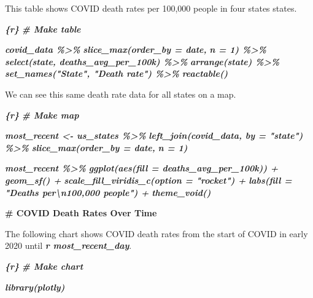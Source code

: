 \documentclass[
]{book}
\newenvironment{Shaded}{\begin{snugshade}}{\end{snugshade}}
\newcommand{\FunctionTok}[1]{\textcolor[rgb]{0.13,0.29,0.53}{\textbf{#1}}}
\newcommand{\InformationTok}[1]{\textcolor[rgb]{0.56,0.35,0.01}{\textbf{\textit{#1}}}}
\newcommand{\NormalTok}[1]{#1}
\begin{document}
\begin{Shaded}
\begin{Highlighting}[]
\NormalTok{This table shows COVID death rates per 100,000 people in four states states.}

\InformationTok{\textasciigrave{}\textasciigrave{}\textasciigrave{}\{r\}}
\InformationTok{\# Make table}

\InformationTok{covid\_data \%\textgreater{}\% }
\InformationTok{  slice\_max(order\_by = date,}
\InformationTok{            n = 1) \%\textgreater{}\%}
\InformationTok{  select(state, deaths\_avg\_per\_100k) \%\textgreater{}\% }
\InformationTok{  arrange(state) \%\textgreater{}\% }
\InformationTok{  set\_names("State", "Death rate") \%\textgreater{}\% }
\InformationTok{  reactable()}
\InformationTok{\textasciigrave{}\textasciigrave{}\textasciigrave{}}

\NormalTok{We can see this same death rate data for all states on a map.}

\InformationTok{\textasciigrave{}\textasciigrave{}\textasciigrave{}\{r\}}
\InformationTok{\# Make map}

\InformationTok{most\_recent \textless{}{-} us\_states \%\textgreater{}\% }
\InformationTok{  left\_join(covid\_data, by = "state") \%\textgreater{}\% }
\InformationTok{  slice\_max(order\_by = date,}
\InformationTok{            n = 1) }

\InformationTok{most\_recent \%\textgreater{}\% }
\InformationTok{  ggplot(aes(fill = deaths\_avg\_per\_100k)) +}
\InformationTok{  geom\_sf() +}
\InformationTok{  scale\_fill\_viridis\_c(option = "rocket") +}
\InformationTok{  labs(fill = "Deaths per\textbackslash{}n100,000 people") +}
\InformationTok{  theme\_void()}
\InformationTok{\textasciigrave{}\textasciigrave{}\textasciigrave{}}

\FunctionTok{\# COVID Death Rates Over Time}

\NormalTok{The following chart shows COVID death rates from the start of COVID in early 2020 until }\InformationTok{\textasciigrave{}r most\_recent\_day\textasciigrave{}}\NormalTok{.}

\InformationTok{\textasciigrave{}\textasciigrave{}\textasciigrave{}\{r\}}
\InformationTok{\# Make chart}

\InformationTok{library(plotly)}


\end{Highlighting}
\end{Shaded}
\end{document}
